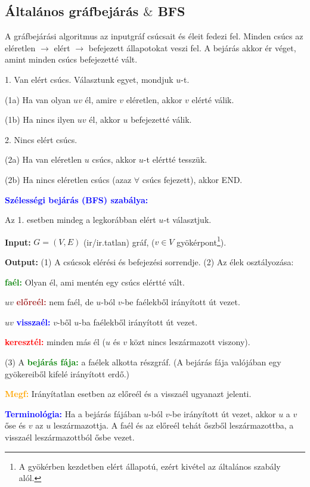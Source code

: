 \documentclass[../szamtud.tex]{subfiles}
\begin{document}
\subsection{Általános gráfbejárás $\&$ BFS}

			A gráfbejárási algoritmus az inputgráf csúcsait és éleit fedezi fel. Minden csúcs az eléretlen $\rightarrow$ elért $\rightarrow$ befejezett állapotokat veszi fel. A bejárás akkor ér véget, amint minden csúcs befejezetté vált. 

			1. Van elért csúcs. Választunk egyet, mondjuk $u$-t.
				
			(1a) Ha van olyan $uv$ él, amire $v$ eléretlen, akkor $v$ elérté válik.

			(1b) Ha nincs ilyen $uv$ él, akkor $u$ befejezetté válik.

			2. Nincs elért csúcs.

			(2a) Ha van eléretlen $u$ csúcs, akkor $u$-t elértté tesszük.

			(2b) Ha nincs eléretlen csúcs (azaz $\forall$ csúcs fejezett), akkor END.

			\textbf{\textcolor{blue}{Szélességi bejárás (BFS) szabálya:}}

			Az 1. esetben mindeg a legkorábban elért $u$-t választjuk.

			\textbf{Input:} $G = (V,E)$ (ir/ir.tatlan) gráf, ($v \in V$ gyökérpont\footnote{A gyökérben kezdetben elért állapotú, ezért kivétel az általános szabály alól.}).

			\textbf{Output:} (1) A csúcsok elérési és befejezési sorrendje. (2) Az élek osztályozása:

			\textbf{\textcolor{green}{faél:}} Olyan él, ami mentén egy csúcs elértté vált.

			$uv$ \textbf{\textcolor{brown}{előreél:}} nem faél, de $u$-ból $v$-be faélekből irányított út vezet.

			$uv$ \textbf{\textcolor{blue}{visszaél:}} $v$-ből $u$-ba faélekből irányított út vezet.

			\textbf{\textcolor{red}{keresztél:}} minden más él ($u$ és $v$ közt nincs leszármazott viszony).

			(3) A \textbf{\textcolor{green}{bejárás fája:}} a faélek alkotta részgráf. (A bejárás fája valójában egy gyökereiből kifelé irányított erdő.)

			\textbf{\textcolor{orange}{Megf:}} Irányítatlan esetben az előreél és a visszaél ugyanazt jelenti.

			\textbf{\textcolor{blue}{Terminológia:}} Ha a bejárás fájában $u$-ból $v$-be irányított út vezet, akkor $u$ a $v$ őse és $v$ az $u$ leszármazottja. A faél és az előreél tehát őszből leszármazottba, a visszaél leszármazottból ősbe vezet.
\end{document}
